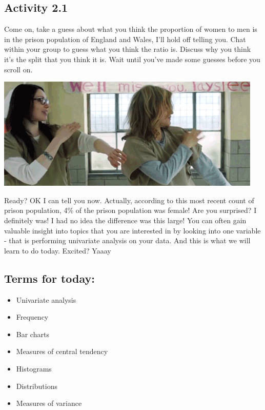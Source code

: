 \documentclass[
]{book}
\providecommand{\tightlist}{%
  \setlength{\itemsep}{0pt}\setlength{\parskip}{0pt}}
\begin{document}
\hypertarget{activity-2.1}{%
\subsection{Activity 2.1}\label{activity-2.1}}

Come on, take a guess about what you think the proportion of women to men is in the prison population of England and Wales, I'll hold off telling you. Chat within your group to guess what you think the ratio is. Discuss why you think it's the split that you think it is. Wait until you've made some guesses before you scroll on.

\includegraphics{imgs/oitnb_dance.gif}

Ready? OK I can tell you now. Actually, according to this most recent count of prison population, 4\% of the prison population was female! Are you surprised? I definitely was! I had no idea the difference was this large! You can often gain valuable insight into topics that you are interested in by looking into one variable - that is performing univariate analysis on your data. And this is what we will learn to do today. Excited? Yaaay

\hypertarget{terms-for-today}{%
\subsection{Terms for today:}\label{terms-for-today}}

\begin{itemize}
\tightlist
\item
  Univariate analysis
\item
  Frequency
\item
  Bar charts
\item
  Measures of central tendency
\item
  Histograms
\item
  Distributions
\item
  Measures of variance
\end{itemize}
\end{document}
